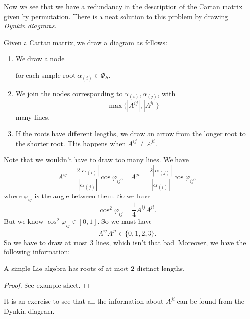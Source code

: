 \documentclass[a4paper]{article}
\begin{document}
Now we see that we have a redundancy in the description of the Cartan matrix given by permutation. There is a neat solution to this problem by drawing \emph{Dynkin diagrams}.
\begin{defi}
  Given a Cartan matrix, we draw a diagram as follows:
  \begin{enumerate}
    \item We draw a node
      \begin{center}
      \end{center}
      for each simple root $\alpha_{(i)} \in \Phi_S$.
    \item We join the nodes corresponding to $\alpha_{(i)}, \alpha_{(j)}$, with
      \[
        \max\{|A^{ij}|, |A^{ji}|\}
      \]
      many lines.
    \item If the roots have different lengths, we draw an arrow from the longer root to the shorter root. This happens when $A^{ij} \not= A^{ji}$.
  \end{enumerate}
\end{defi}
Note that we wouldn't have to draw too many lines. We have
\[
  A^{ij} = \frac{2|\alpha_{(i)}|}{|\alpha_{(j)}|} \cos \varphi_{ij},\quad A^{ji} = \frac{2|\alpha_{(j)}|}{|\alpha_{(i)}|} \cos \varphi_{ij},
\]
where $\varphi_{ij}$ is the angle between them. So we have
\[
  \cos^2 \varphi_{ij} = \frac{1}{4} A^{ij} A^{ji}.
\]
But we know $\cos^2 \varphi_{ij} \in [0, 1]$. So we must have
\[
  A^{ij} A^{ji} \in \{0, 1, 2, 3\}.
\]
So we have to draw at most $3$ lines, which isn't that bad. Moreover, we have the following information:
\begin{prop}
  A simple Lie algebra has roots of at most $2$ distinct lengths.
\end{prop}

\begin{proof}
  See example sheet.
\end{proof}

It is an exercise to see that all the information about $A^{ji}$ can be found from the Dynkin diagram.
\end{document}

